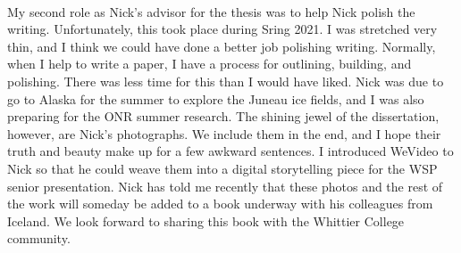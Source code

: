\documentclass[../../../main.tex]{subfiles}
\begin{document}
\\
\vspace{0.15cm}
My second role as Nick's advisor for the thesis was to help Nick polish the writing.  Unfortunately, this took place during Sring 2021.  I was stretched very thin, and I think we could have done a better job polishing writing.  Normally, when I help to write a paper, I have a process for outlining, building, and polishing.  There was less time for this than I would have liked.  Nick was due to go to Alaska for the summer to explore the Juneau ice fields, and I was also preparing for the ONR summer research.  The shining jewel of the dissertation, however, are Nick's photographs.  We include them in the end, and I hope their truth and beauty make up for a few awkward sentences.  I introduced WeVideo to Nick so that he could weave them into a digital storytelling piece for the WSP senior presentation.  Nick has told me recently that these photos and the rest of the work will someday be added to a book underway with his colleagues from Iceland.  We look forward to sharing this book with the Whittier College community.
\end{document}

